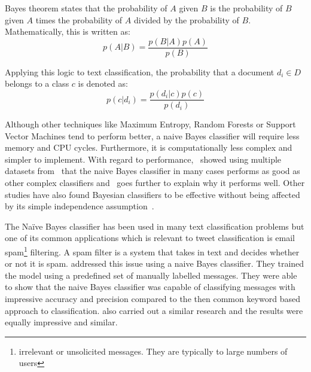 Bayes theorem states that the probability of $A$ given $B$ is the probability of $B$ given $A$ times
the probability of $A$ divided by the probability of $B$. Mathematically, this is written as:
\begin{equation}
  p(A|B) = \frac{p(B|A)p(A)}{p(B)}
\end{equation}

Applying this logic to text classification, the probability that a document $d_i \in D$ belongs to a
class $c$ is denoted as:
\begin{equation}
  p(c|d_i) = \frac{p(d_i|c)p(c)}{p(d_i)}
\end{equation}

Although other techniques like Maximum Entropy, Random Forests or Support Vector Machines tend to
perform better, a naive Bayes classifier will require less memory and CPU cycles. Furthermore, it is
computationally less complex and simpler to implement. With regard to
performance,~\citet{huangLuLing2003} showed using multiple datasets from~\citet{blakeMerz1998} that
the naive Bayes classifier in many cases performs as good as other complex classifiers
and~\citet{zhang2004} goes further to explain why it performs well. Other studies have also found
Bayesian classifiers to be effective without being affected by its simple independence
assumption~\citep{langley1992analysis,manning2008}.

The Na\"{i}ve Bayes classifier has been used in many text classification problems but one of its
common applications which is relevant to tweet classification is email spam\footnote{irrelevant or
unsolicited messages. They are typically to large numbers of users} filtering. A spam
filter is a system that takes in text and decides whether or not it is
spam. \citet{androutsopoulos2000learning} addressed this issue using a naive Bayes classifier. They
trained the model using a predefined set of manually labelled messages. They were able to show that
the naive Bayes classifier was capable of classifying messages with impressive accuracy and precision
compared to the then common keyword based approach to classification. \citet{deshpande2007evaluation}
also carried out a similar research and the results were equally impressive and similar.

